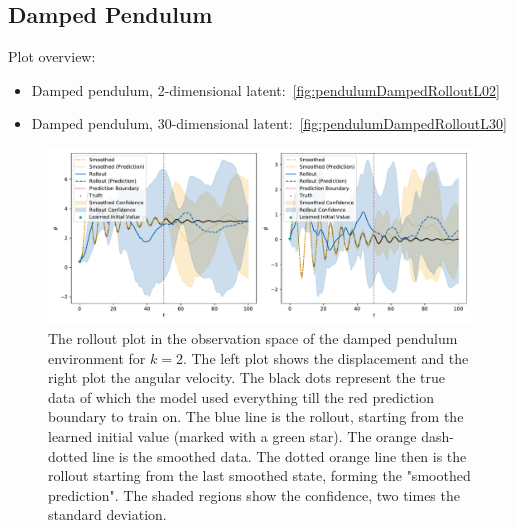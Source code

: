 	\subsection{Damped Pendulum}
		Plot overview:
		\begin{itemize}
			\item Damped pendulum, 2-dimensional latent:~\autoref{fig:pendulumDampedRolloutL02}
			\item Damped pendulum, 30-dimensional latent:~\autoref{fig:pendulumDampedRolloutL30}
		\end{itemize}

		\begin{figure}
			\centering
			\includegraphics[width=\linewidth]{figures/results/pendulum-damped/run-latent-dim-02/rollout-observations-N0.pdf}
			\caption{The rollout plot in the observation space of the damped pendulum environment for \(k = 2\). The left plot shows the displacement and the right plot the angular velocity. The black dots represent the true data of which the model used everything till the red prediction boundary to train on. The blue line is the rollout, starting from the learned initial value (marked with a green star). The orange dash-dotted line is the smoothed data. The dotted orange line then is the rollout starting from the last smoothed state, forming the "smoothed prediction". The shaded regions show the confidence, \ie two times the standard deviation.}
			\label{fig:pendulumDampedRolloutL02}
		\end{figure}

